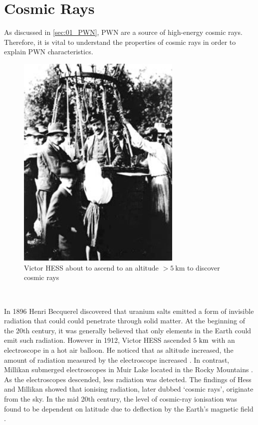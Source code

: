 \section{Cosmic Rays} \label{sec:01_cosmic_rays}

As discussed in \autoref{sec:01_PWN}, PWN are a source of high-energy cosmic rays. Therefore, it is vital to understand the properties of cosmic rays in order to explain PWN characteristics.
\begin{figure}[ht]
	\centering
	\includegraphics[width=0.7\textwidth]{04_Introduction/Images/History/hess_balloon_flight.jpg}
	\caption{Victor HESS about to ascend to an altitude $>5~\si{\kilo\meter}$ to discover cosmic rays \citep{hess1912observations}}
	\label{fig:chapter1_hess_balloon_flight}
\end{figure}
\par~\par 
In 1896 Henri Becquerel discovered that uranium salts emitted a form of invisible radiation that could could penetrate through solid matter. At the beginning of the 20th century, it was generally believed that only elements in the Earth could emit such radiation. However in 1912, Victor HESS ascended $5~\si{\kilo\meter}$ with an electroscope in a hot air balloon. He noticed that as altitude increased, the amount of radiation measured by the electroscope increased \citep{hess1912observations}. In contrast, Millikan submerged electroscopes in Muir Lake located in the Rocky Mountains \citep{1926PhRv...28..851M}.  As the electroscopes descended, less radiation was detected. The findings of Hess and Millikan showed that ionising radiation, later dubbed `cosmic rays', originate from the sky. In the mid 20th century, the level of cosmic-ray ionisation was found to be dependent on latitude due to deflection by the Earth's magnetic field \citep{1960Natur.187.1099S}.
